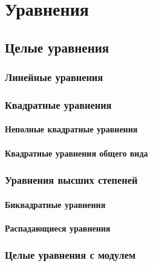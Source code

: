 \chapter{Уравнения}
\section{Целые уравнения}
	\subsection{Линейные уравнения}
	\subsection{Квадратные уравнения}
		\subsubsection{Неполные квадратные уравнения}
		\subsubsection{Квадратные уравнения общего вида}
	\subsection{Уравнения высших степеней}
		\subsubsection{Биквадратные уравнения}
		\subsubsection{Распадающиеся уравнения}
	\subsection{Целые уравнения с модулем}
